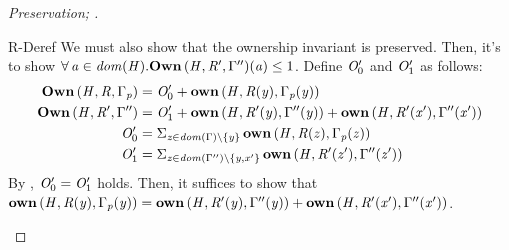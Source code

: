 \begin{proof}[Preservation; ]
\begin{rneqncase}{R-Deref}
    We must also show that the ownership invariant is preserved.
    Then, it's to show $\forall \,  \mathit{a}  \in \mathit{dom}( \mathit{H} )   .  \mathbf{Own} \, (  \mathit{H}  ,  \mathit{R'}  ,  \Gamma''  )  (  \mathit{a}  )  \le  1$. Define $\mathit{O'_{{\mathrm{0}}}}$ and $\mathit{O'_{{\mathrm{1}}}}$ as follows:
    \begin{align*}
      \mathbf{Own} \, (  \mathit{H}  ,  \mathit{R}  ,  \Gamma_{\mathit{p}}  ) & = \mathit{O'_{{\mathrm{0}}}}  +  \mathbf{own} \, (  \mathit{H}  ,  \mathit{R}  (  \mathit{y}  )  ,  \Gamma_{\mathit{p}}  (  \mathit{y}  )  ) \\
      \mathbf{Own} \, (  \mathit{H}  ,  \mathit{R'}  ,  \Gamma''  ) & =\mathit{O'_{{\mathrm{1}}}}  +  \mathbf{own} \, (  \mathit{H}  ,  \mathit{R'}  (  \mathit{y}  )  ,  \Gamma''  (  \mathit{y}  )  )  +  \mathbf{own} \, (  \mathit{H}  ,  \mathit{R'}  (  \mathit{x'}  )  ,  \Gamma''  (  \mathit{x'}  )  ) \\
      \mathit{O'_{{\mathrm{0}}}} &  =  \Sigma _{ \mathit{z} \in   \mathit{dom}( \Gamma )   \setminus   \left\{{ \mathit{y} }\right\}   }\, \mathbf{own} \, (  \mathit{H}  ,  \mathit{R}  (  \mathit{z}  )  ,  \Gamma_{\mathit{p}}  (  \mathit{z}  )  )  \\
      \mathit{O'_{{\mathrm{1}}}} & =  \Sigma _{ \mathit{z} \in   \mathit{dom}( \Gamma'' )   \setminus  \{  \mathit{y}  ,  \mathit{x'}  \}  }\, \mathbf{own} \, (  \mathit{H}  ,  \mathit{R'}  (  \mathit{z'}  )  ,  \Gamma''  (  \mathit{z'}  )  ) 
    \end{align*}
    By , $\mathit{O'_{{\mathrm{0}}}}  =  \mathit{O'_{{\mathrm{1}}}}$ holds. Then, it suffices to show that
    $\mathbf{own} \, (  \mathit{H}  ,  \mathit{R}  (  \mathit{y}  )  ,  \Gamma_{\mathit{p}}  (  \mathit{y}  )  )  =  \mathbf{own} \, (  \mathit{H}  ,  \mathit{R'}  (  \mathit{y}  )  ,  \Gamma''  (  \mathit{y}  )  )  +  \mathbf{own} \, (  \mathit{H}  ,  \mathit{R'}  (  \mathit{x'}  )  ,  \Gamma''  (  \mathit{x'}  )  )$.
    

\end{rneqncase}
\end{proof}
